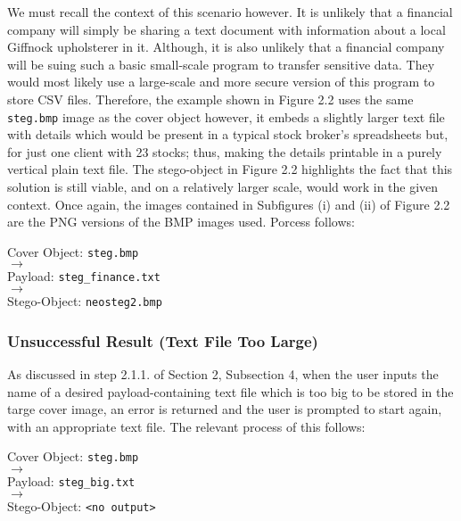 \documentclass[11pt, english]{article}
\begin{document}
	We must recall the context of this scenario however. It is unlikely that a financial company will simply be sharing a text document with information about a local Giffnock upholsterer in it. Although, it is also unlikely that a financial company will be suing such a basic small-scale program to transfer sensitive data. They would most likely use a large-scale and more secure version of this program to store CSV files. Therefore, the example shown in Figure 2.2 uses the same \verb|steg.bmp| image as the cover object however, it embeds a slightly larger text file with details which would be present in a typical stock broker's spreadsheets but, for just one client with 23 stocks; thus, making the details printable in a purely vertical plain text file. The stego-object in Figure 2.2 highlights the fact that this solution is still viable, and on a relatively larger scale, would work in the given context. Once again, the images contained in Subfigures (i) and (ii) of Figure 2.2 are the PNG versions of the BMP images used. Porcess follows:\\

	\begin{center}
		Cover Object: \verb|steg.bmp|\\ $\longrightarrow$\\ Payload: \verb|steg_finance.txt|\\ $\longrightarrow$\\ Stego-Object: \verb|neosteg2.bmp|
	\end{center}

		\subsubsection{Unsuccessful Result (Text File Too Large)}
	
	As discussed in step 2.1.1. of Section 2, Subsection 4, when the user inputs the name of a desired payload-containing text file which is too big to be stored in the targe cover image, an error is returned and the user is prompted to start again, with an appropriate text file. The relevant process of this follows:\\

	\begin{center}
		Cover Object: \verb|steg.bmp|\\ $\longrightarrow$\\ Payload: \verb|steg_big.txt|\\ $\longrightarrow$\\ Stego-Object: \verb|<no output>|
	\end{center}
\end{document}
